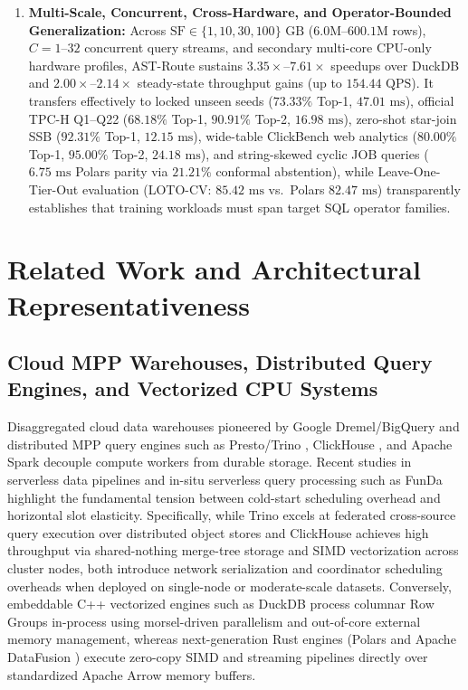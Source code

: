 \documentclass[10pt,a4paper]{article}
\begin{document}
\begin{enumerate}
    \item \textbf{Multi-Scale, Concurrent, Cross-Hardware, and Operator-Bounded Generalization:} Across $\text{SF}\in\{1, 10, 30, 100\}\text{ GB}$ ($6.0\text{M}\text{--}600.1\text{M}$ rows), $C=1\text{--}32$ concurrent query streams, and secondary multi-core CPU-only hardware profiles, AST-Route sustains $3.35\times\text{--}7.61\times$ speedups over DuckDB and $2.00\times\text{--}2.14\times$ steady-state throughput gains (up to $154.44\text{ QPS}$). It transfers effectively to locked unseen seeds ($73.33\%$ Top-1, $47.01\text{ ms}$), official TPC-H Q1--Q22 ($68.18\%$ Top-1, $90.91\%$ Top-2, $16.98\text{ ms}$), zero-shot star-join SSB ($92.31\%$ Top-1, $12.15\text{ ms}$), wide-table ClickBench web analytics ($80.00\%$ Top-1, $95.00\%$ Top-2, $24.18\text{ ms}$), and string-skewed cyclic JOB queries ($6.75\text{ ms}$ Polars parity via $21.21\%$ conformal abstention), while Leave-One-Tier-Out evaluation (LOTO-CV: $85.42\text{ ms}$ vs.\ Polars $82.47\text{ ms}$) transparently establishes that training workloads must span target SQL operator families.
\end{enumerate}

\section{Related Work and Architectural Representativeness}
\subsection{Cloud MPP Warehouses, Distributed Query Engines, and Vectorized CPU Systems}
Disaggregated cloud data warehouses pioneered by Google Dremel/BigQuery \cite{melnik2010dremel, melnik2020dremel} and distributed MPP query engines such as Presto/Trino \cite{sethi2019presto}, ClickHouse \cite{schulze2024clickhouse}, and Apache Spark \cite{ahmed2020hibench} decouple compute workers from durable storage. Recent studies in serverless data pipelines \cite{shojaee2024serverless} and in-situ serverless query processing such as FunDa \cite{lounissi2025funda} highlight the fundamental tension between cold-start scheduling overhead and horizontal slot elasticity. Specifically, while Trino \cite{sethi2019presto} excels at federated cross-source query execution over distributed object stores and ClickHouse \cite{schulze2024clickhouse} achieves high throughput via shared-nothing merge-tree storage and SIMD vectorization across cluster nodes, both introduce network serialization and coordinator scheduling overheads when deployed on single-node or moderate-scale datasets. Conversely, embeddable C++ vectorized engines such as DuckDB \cite{raasveldt2019duckdb, kuiper2024duckdb_ooc} process columnar Row Groups in-process using morsel-driven parallelism and out-of-core external memory management, whereas next-generation Rust engines (Polars and Apache DataFusion \cite{lamb2024datafusion}) execute zero-copy SIMD and streaming pipelines directly over standardized Apache Arrow memory buffers.
\end{document}

